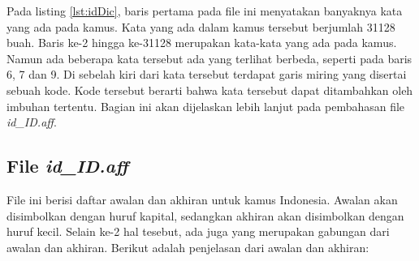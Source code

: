 	
	
Pada listing \ref{lst:idDic}, baris pertama pada file ini menyatakan banyaknya kata yang ada pada kamus. Kata yang ada dalam kamus tersebut berjumlah 31128 buah. Baris ke-2 hingga ke-31128 merupakan kata-kata yang ada pada kamus. Namun ada beberapa kata tersebut ada yang terlihat berbeda, seperti pada baris 6, 7 dan 9. Di sebelah kiri dari kata tersebut terdapat garis miring yang disertai sebuah kode. Kode tersebut berarti bahwa kata tersebut dapat ditambahkan oleh imbuhan tertentu. Bagian ini akan dijelaskan lebih lanjut pada pembahasan file \textit{id\_ID.aff}.

\subsection{File \textit{id\_ID.aff}}

File ini berisi daftar awalan dan akhiran untuk kamus Indonesia. Awalan akan disimbolkan dengan huruf kapital, sedangkan akhiran akan disimbolkan dengan huruf kecil. Selain ke-2 hal tesebut, ada juga yang merupakan gabungan dari awalan dan akhiran. Berikut adalah penjelasan dari awalan dan akhiran:

